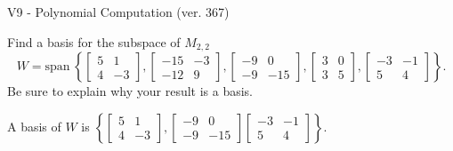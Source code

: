 \begin{exercise}
  \begin{exerciseTitle}V9 - Polynomial Computation (ver. 367)\end{exerciseTitle}
  \begin{exerciseStatement}
    Find a basis for the subspace of \(M_{2,2}\) 
\[W=\mathrm{span}\ \left\{\left[\begin{array}{cc}
5 & 1 \\
4 & -3
\end{array}\right] , \left[\begin{array}{cc}
-15 & -3 \\
-12 & 9
\end{array}\right] , \left[\begin{array}{cc}
-9 & 0 \\
-9 & -15
\end{array}\right] , \left[\begin{array}{cc}
3 & 0 \\
3 & 5
\end{array}\right] , \left[\begin{array}{cc}
-3 & -1 \\
5 & 4
\end{array}\right]\right\}.\]
 Be sure to explain why your result is a basis.


  \end{exerciseStatement}
  \begin{exerciseAnswer}
   A basis of \(W\) is  \(\left\{\left[\begin{array}{cc}
5 & 1 \\
4 & -3
\end{array}\right] , \left[\begin{array}{cc}
-9 & 0 \\
-9 & -15
\end{array}\right] \left[\begin{array}{cc}
-3 & -1 \\
5 & 4
\end{array}\right]\right\}\).
  


  \end{exerciseAnswer}
\end{exercise}